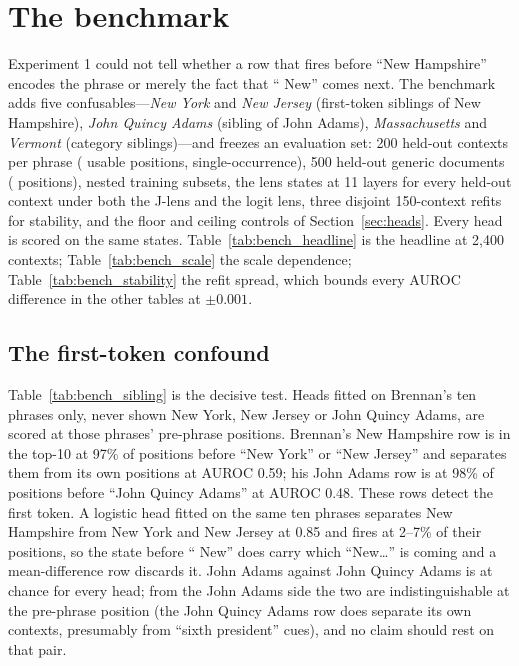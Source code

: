\documentclass[11pt]{article}
\begin{document}



\section{The benchmark}
\label{sec:bench}
Experiment 1 could not tell whether a row that fires before ``New Hampshire'' encodes the phrase or merely the fact that `` New'' comes next. The benchmark adds five confusables---\emph{New York} and \emph{New Jersey} (first-token siblings of New Hampshire), \emph{John Quincy Adams} (sibling of John Adams), \emph{Massachusetts} and \emph{Vermont} (category siblings)---and freezes an evaluation set: 200 held-out contexts per phrase (\BnHeld{} usable positions, \BsingleFrac{} single-occurrence), 500 held-out generic documents (\BnGenericEval{} positions), nested training subsets, the lens states at 11 layers for every held-out context under both the J-lens and the logit lens, three disjoint 150-context refits for stability, and the floor and ceiling controls of Section~\ref{sec:heads}. Every head is scored on the same states. Table~\ref{tab:bench_headline} is the headline at 2{,}400 contexts; Table~\ref{tab:bench_scale} the scale dependence; Table~\ref{tab:bench_stability} the refit spread, which bounds every AUROC difference in the other tables at $\pm0.001$.





\subsection{The first-token confound}
Table~\ref{tab:bench_sibling} is the decisive test. Heads fitted on Brennan's ten phrases only, never shown New York, New Jersey or John Quincy Adams, are scored at those phrases' pre-phrase positions. Brennan's New Hampshire row is in the top-10 at 97\% of positions before ``New York'' or ``New Jersey'' and separates them from its own positions at AUROC 0.59; his John Adams row is at 98\% of positions before ``John Quincy Adams'' at AUROC 0.48. These rows detect the first token. A logistic head fitted on the same ten phrases separates New Hampshire from New York and New Jersey at 0.85 and fires at 2--7\% of their positions, so the state before `` New'' does carry which ``New\ldots'' is coming and a mean-difference row discards it. John Adams against John Quincy Adams is at chance for every head; from the John Adams side the two are indistinguishable at the pre-phrase position (the John Quincy Adams row does separate its own contexts, presumably from ``sixth president'' cues), and no claim should rest on that pair.
\end{document}
